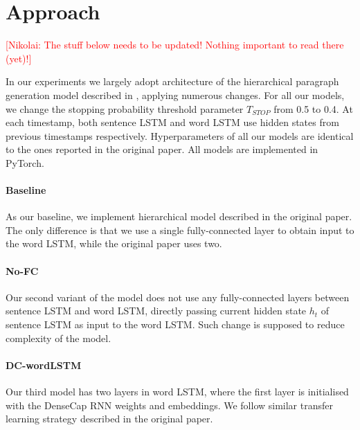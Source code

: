 \documentclass[11pt,a4paper]{article}
\newcommand{\kibitz}[2]{\ifnum\Comments=1\textcolor{#1}{#2}\fi}
\newcommand{\nikolai}[1]{\kibitz{red}      {[Nikolai: #1]}}
\begin{document}
\section{Approach}
\nikolai{The stuff below needs to be updated! Nothing important to read there (yet)!}


In our experiments we largely adopt architecture of the hierarchical paragraph generation model described in \cite{krause2016hierarchical}, applying numerous changes. For all our models, we change the stopping probability threshold parameter $T_{STOP}$ from 0.5 to 0.4. At each timestamp, both sentence LSTM and word LSTM use hidden states from previous timestamps respectively. Hyperparameters of all our models are identical to the ones reported in the original paper. All models are implemented in PyTorch.

\paragraph{Baseline} As our baseline, we implement hierarchical model described in the original paper. The only difference is that we use a single fully-connected layer to obtain input to the word LSTM, while the original paper uses two.

\paragraph{No-FC} Our second variant of the model does not use any fully-connected layers between sentence LSTM and word LSTM, directly passing current hidden state $h_t$ of sentence LSTM as input to the word LSTM. Such change is supposed to reduce complexity of the model.

\paragraph{DC-wordLSTM} Our third model has two layers in word LSTM, where the first layer is initialised with the DenseCap RNN weights and embeddings. We follow similar transfer learning strategy described in the original paper.
\end{document}

